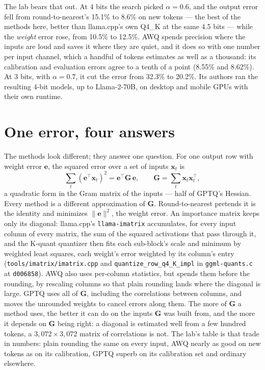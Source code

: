 The lab bears that out. At 4 bits the search picked $\alpha = 0.6$, and the
output error fell from round-to-nearest's 15.1\% to 8.6\% on new tokens --- the
best of the methods here, better than llama.cpp's own Q4\_K at the same 4.5
bits --- while the \emph{weight} error rose, from 10.5\% to 12.5\%. AWQ spends
precision where the inputs are loud and saves it where they are quiet, and it
does so with one number per input channel, which a handful of tokens estimates
as well as a thousand: its calibration and evaluation errors agree to a tenth
of a point (8.55\% and 8.62\%). At 3 bits, with $\alpha = 0.7$, it cut the error
from 32.3\% to 20.2\%. Its authors ran the resulting 4-bit models, up to
Llama-2-70B, on desktop and mobile GPUs with their own runtime.

\section{One error, four answers}

The methods look different; they answer one question. For one output row with
weight error $\mathbf{e}$, the squared error over a set of inputs
$\mathbf{x}_t$ is
\begin{equation}
\sum_t (\mathbf{e}^{\top}\mathbf{x}_t)^2 = \mathbf{e}^{\top}\mathbf{G}\,\mathbf{e},
\qquad \mathbf{G} = \sum_t \mathbf{x}_t\mathbf{x}_t^{\top},
\label{eq:gram-error}
\end{equation}
a quadratic form in the Gram matrix of the inputs --- half of GPTQ's Hessian.
Every method is a different approximation of $\mathbf{G}$. Round-to-nearest
pretends it is the identity and minimizes $\lVert\mathbf{e}\rVert^2$, the weight
error. An importance matrix keeps only its diagonal: llama.cpp's
\texttt{llama-imatrix} accumulates, for every input column of every matrix, the
sum of the squared activations that pass through it, and the K-quant quantizer
then fits each sub-block's scale and minimum by weighted least squares, each
weight's error weighted by its column's entry (\texttt{tools/imatrix/imatrix.cpp}
and \texttt{quantize\_row\_q4\_K\_impl} in \texttt{ggml-quants.c} at
\texttt{d006858}). AWQ also uses per-column statistics, but spends them before
the rounding, by rescaling columns so that plain rounding lands where the
diagonal is large. GPTQ uses all of $\mathbf{G}$, including the correlations
between columns, and moves the unrounded weights to cancel errors along them.
The more of $\mathbf{G}$ a method uses, the better it can do on the inputs
$\mathbf{G}$ was built from, and the more it depends on $\mathbf{G}$ being
right: a diagonal is estimated well from a few hundred tokens, a
$3{,}072 \times 3{,}072$ matrix of correlations is not. The lab's table is that
trade in numbers: plain rounding the same on every input, AWQ nearly as good on
new tokens as on its calibration, GPTQ superb on its calibration set and
ordinary elsewhere.

